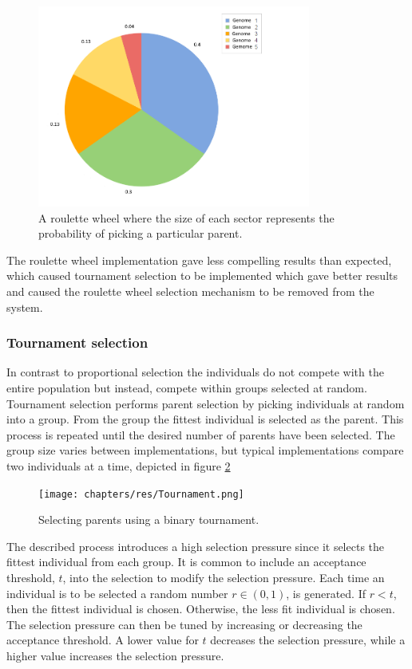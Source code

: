 \begin{figure}[H]
	\centering
	\includegraphics[width=0.80\textwidth, clip]{chapters/res/roulette.png}
	\caption{A roulette wheel where the size of each sector represents the probability of picking a particular parent.}
	\label{fig:roulette}
\end{figure}

The roulette wheel implementation gave less compelling results than expected, which caused tournament selection to be implemented which gave better results and caused the roulette wheel selection mechanism to be removed from the system.
		
\subsubsection{Tournament selection}
In contrast to proportional selection the individuals do not compete with the entire population but instead, compete within groups selected at random.
Tournament selection performs parent selection by picking individuals at random into a group.
From the group the fittest individual is selected as the parent.
This process is repeated until the desired number of parents have been selected.
The group size varies between implementations, but typical implementations compare two\cite{goh_sexual_2003} individuals at a time, depicted in figure \ref{fig:tournament}

\begin{figure}[H]    
	\centering
	\texttt{[image: chapters/res/Tournament.png]}
	\caption{Selecting parents using a binary tournament.}
	\label{fig:tournament}
\end{figure}

The described process introduces a high selection pressure since it selects the fittest individual from each group.
It is common to include an acceptance threshold, $t$, into the selection to modify the selection pressure\cite{goh_sexual_2003}.
Each time an individual is to be selected a random number $r \in (0, 1)$, is generated.
If $r < t$, then the fittest individual is chosen. 
Otherwise, the less fit individual is chosen. 
The selection pressure can then be tuned by increasing or decreasing the acceptance threshold. 
A lower value for $t$ decreases the selection pressure, while a higher value increases the selection pressure.

